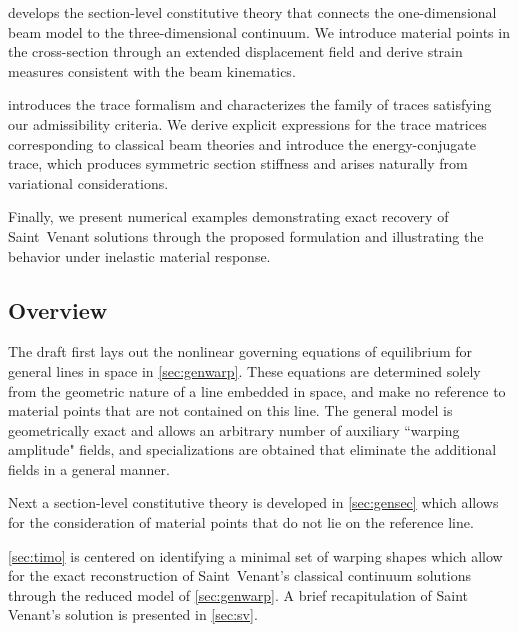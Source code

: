  develops the section-level constitutive theory that connects 
the one-dimensional beam model to the three-dimensional continuum. 
We introduce material points in the cross-section through an extended displacement field and derive strain measures consistent with the beam kinematics.

 introduces the trace formalism and characterizes the family 
of traces satisfying our admissibility criteria. We derive explicit expressions 
for the trace matrices corresponding to classical beam theories and introduce 
the energy-conjugate trace, which produces symmetric section stiffness and arises naturally from variational considerations.

Finally, we present numerical examples demonstrating exact recovery of 
Saint~Venant solutions through the proposed formulation and illustrating 
the behavior under inelastic material response.

\subsection{Overview}

The draft first lays out the nonlinear governing equations of equilibrium for general lines in space in \cref{sec:genwarp}. 
These equations are determined solely from the geometric nature of a line embedded in space, and make no reference to material points that are not contained on this line. 
The general model is geometrically exact and allows an arbitrary number of auxiliary ``warping amplitude" fields, and specializations are obtained that eliminate the additional fields in a general manner. 

Next a section-level constitutive theory is developed in \cref{sec:gensec} which allows for the consideration of material points that do not lie on the reference line.

\cref{sec:timo} is centered on identifying a minimal set of warping shapes which allow for the exact reconstruction of Saint~Venant's classical continuum solutions through the reduced model of \cref{sec:genwarp}. 
A brief recapitulation of Saint Venant's solution is presented in \cref{sec:sv}. 

